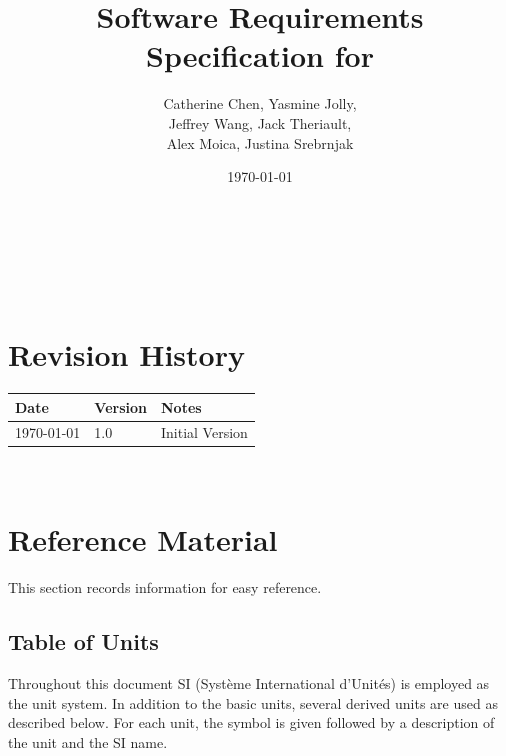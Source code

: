 \documentclass[12pt]{article}
\begin{document}
\title{Software Requirements Specification for \progname} 
\author{Catherine Chen, Yasmine Jolly,\\ Jeffrey Wang, Jack Theriault,\\ Alex 
Moica, Justina Srebrnjak}
\date{\today}
	
\maketitle

~\newpage


\tableofcontents

~\newpage

\section*{Revision History}

\begin{tabularx}{\textwidth}{p{3cm}p{2cm}X}
\toprule {\bf Date} & {\bf Version} & {\bf Notes}\\
\midrule
\today & 1.0 & Initial Version\\
\bottomrule
\end{tabularx}

~\newpage

\section{Reference Material}

This section records information for easy reference.

\subsection{Table of Units}

Throughout this document SI (Syst\`{e}me International d'Unit\'{e}s) is employed
as the unit system.  In addition to the basic units, several derived units are
used as described below.  For each unit, the symbol is given followed by a
description of the unit and the SI name.
~\newline
\end{document}
